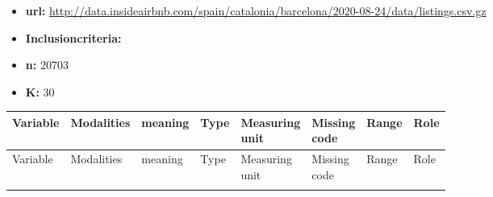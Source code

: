 

\begin{itemize}
         \item \textbf{url:} \url{http://data.insideairbnb.com/spain/catalonia/barcelona/2020-08-24/data/listings.csv.gz}
         \item \textbf{Inclusioncriteria:}
         \item \textbf{n:} 20703
         \item \textbf{K:} 30
\end{itemize}

\begin{center}
\begin{longtable}{@{}llllllll@{}}
\toprule
Variable & Modalities & meaning & Type & \makecell{Measuring\\ unit} & \makecell{Missing\\ code} & Range & Role \\ \midrule
\endfirsthead
\toprule
Variable & Modalities & meaning & Type & \makecell{Measuring\\ unit} & \makecell{Missing\\ code} & Range & Role \\ \midrule

\endhead
\bottomrule
\endfoot
\bottomrule
\endlastfoot


\end{longtable}
\end{center}
